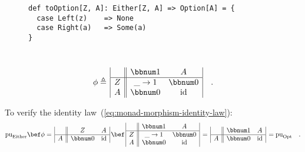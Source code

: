 \begin{wrapfigure}{l}{0.5\columnwidth}%
\vspace{-0.75\baselineskip}

\begin{lstlisting}
def toOption[Z, A]: Either[Z, A] => Option[A] = {
  case Left(z)    => None
  case Right(a)   => Some(a)
}
\end{lstlisting}
\vspace{-1.7\baselineskip}
\end{wrapfigure}%

~\vspace{-0.7\baselineskip}
\[
\phi\triangleq\,\begin{array}{|c||cc|}
 & \bbnum 1 & A\\
\hline Z & \_\rightarrow1 & \bbnum 0\\
A & \bbnum 0 & \text{id}
\end{array}\quad.
\]

To verify the identity law~(\ref{eq:monad-morphism-identity-law}):
\[
\text{pu}_{\text{Either}}\bef\phi=\,\begin{array}{|c||cc|}
 & Z & A\\
\hline A & \bbnum 0 & \text{id}
\end{array}\,\bef\,\begin{array}{|c||cc|}
 & \bbnum 1 & A\\
\hline Z & \_\rightarrow1 & \bbnum 0\\
A & \bbnum 0 & \text{id}
\end{array}\,=\,\begin{array}{|c||cc|}
 & \bbnum 1 & A\\
\hline A & \bbnum 0 & \text{id}
\end{array}\,=\text{pu}_{\text{Opt}}\quad.
\]

